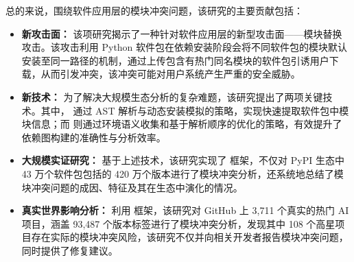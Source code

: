总的来说，围绕软件应用层的模块冲突问题，该研究的主要贡献包括：
\begin{itemize}
\item \textbf{新攻击面：} 该项研究揭示了一种针对软件应用层的新型攻击面——模块替换攻击。该攻击利用 Python 软件包在依赖安装阶段会将不同软件包的模块默认安装至同一路径的机制，通过上传包含有热门同名模块的软件包引诱用户下载，从而引发冲突，该冲突可能对用户系统产生严重的安全威胁。
\item \textbf{新技术：} 为了解决大规模生态分析的复杂难题，该研究提出了两项关键技术。其中， 通过 AST 解析与动态安装模拟的策略，实现快速提取软件包中模块信息；而  则通过环境语义收集和基于解析顺序的优化的策略，有效提升了依赖图构建的准确性与分析效率。
\item \textbf{大规模实证研究：} 基于上述技术，该研究实现了  框架，不仅对 PyPI 生态中 43 万个软件包包括的 420 万个版本进行了模块冲突分析，还系统地总结了模块冲突问题的成因、特征及其在生态中演化的情况。
\item \textbf{真实世界影响分析：} 利用  框架，该研究对 GitHub 上 3,711 个真实的热门 AI 项目，涵盖 93,487 个版本标签进行了模块冲突分析，发现其中 108 个高星项目存在实际的模块冲突风险，该研究不仅并向相关开发者报告模块冲突问题，同时提供了修复建议。
\end{itemize}

